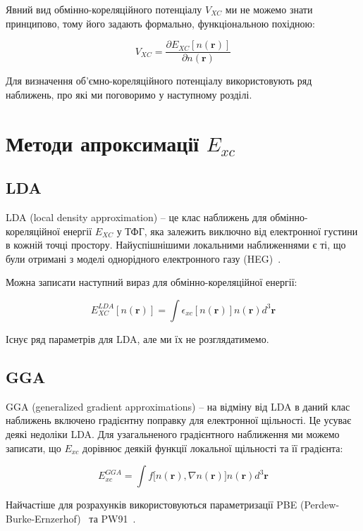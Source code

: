 Явний вид обмінно-кореляційного потенціалу $V_{XC}$ ми не можемо знати принципово, тому його задають формально, функціональною похідною: 

\begin{equation}
    V_{XC} = \frac{\partial E_{XC}[n(\textbf{r})]}{\partial n(\textbf{r})}
\end{equation}

Для визначення об'ємно-кореляційного потенціалу використовують ряд наближень, про які ми поговоримо у наступному розділі.


\section{Методи апроксимації \textbf{$E_{xc}$}}
\subsection{LDA}
LDA (local density approximation) -- це клас наближень для обмінно-кореляційної енергії $E_{XC}$ у ТФГ, яка залежить виключно від електронної густини в кожній точці простору. Найуспішнішими локальними наближеннями є ті, що були отримані з моделі однорідного електронного газу (HEG)~\cite{Hohenberg&Khon}. 

Можна записати наступний вираз для обмінно-кореляційної енергії:

\begin{equation}
    E_{XC}^{LDA}[n(\textbf{r})] = \int{\epsilon_{xc}[n(\textbf{r})]n(\textbf{r})d^3\textbf{r}}
\end{equation}

Існує ряд параметрів для LDA, але ми їх не розглядатимемо.

\subsection{GGA}
GGA (generalized gradient approximations) -- на відміну від LDA в даний клас наближень включено градієнтну поправку для електронної щільності. Це усуває деякі недоліки LDA. Для узагальненого градієнтного наближення ми можемо записати, що $E_{xc}$ дорівнює деякій функції локальної щільності та її градієнта:

\begin{equation}
    E_{xc}^{GGA} = \int{f[n(\textbf{r}),\nabla{n(\textbf{r})]n(\textbf{r})d^3\textbf{r}}}
\end{equation}

Найчастіше для розрахунків використовуються параметризації PBE (Perdew-Burke-Ernzerhof)~\cite{PBE} та PW91~\cite{PW91}.

